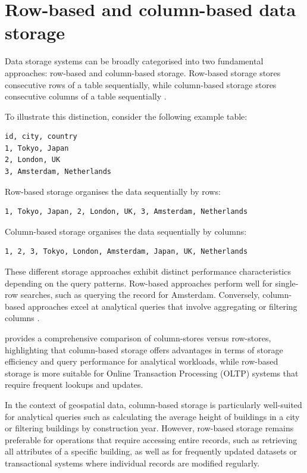 \section{Row-based and column-based data storage}
\label{tb:row_based_column_based_data_storage}

Data storage systems can be broadly categorised into two fundamental approaches: row-based and column-based storage. Row-based storage stores consecutive rows of a table sequentially, while column-based storage stores consecutive columns of a table sequentially \citep{clickhouse_column}.

To illustrate this distinction, consider the following example table:

\begin{lstlisting}[caption={Example table},  basicstyle=\small]
  id, city, country
1, Tokyo, Japan
2, London, UK
3, Amsterdam, Netherlands
\end{lstlisting}

Row-based storage organises the data sequentially by rows:

\begin{lstlisting}[caption={Row-based storage},  basicstyle=\small]
1, Tokyo, Japan, 2, London, UK, 3, Amsterdam, Netherlands
\end{lstlisting}

Column-based storage organises the data sequentially by columns:

\begin{lstlisting}[caption={Column-based storage},  basicstyle=\small]
1, 2, 3, Tokyo, London, Amsterdam, Japan, UK, Netherlands
\end{lstlisting}

These different storage approaches exhibit distinct performance characteristics depending on the query patterns. Row-based approaches perform well for single-row searches, such as querying the record for Amsterdam. Conversely, column-based approaches excel at analytical queries that involve aggregating or filtering columns \citep{clickhouse_column}.

\citet{abadi_2008} provides a comprehensive comparison of column-stores versus row-stores, highlighting that column-based storage offers advantages in terms of storage efficiency and query performance for analytical workloads, while row-based storage is more suitable for Online Transaction Processing (OLTP) systems that require frequent lookups and updates.

In the context of geospatial data, column-based storage is particularly well-suited for analytical queries such as calculating the average height of buildings in a city or filtering buildings by construction year. However, row-based storage remains preferable for operations that require accessing entire records, such as retrieving all attributes of a specific building, as well as for frequently updated datasets or transactional systems where individual records are modified regularly.

